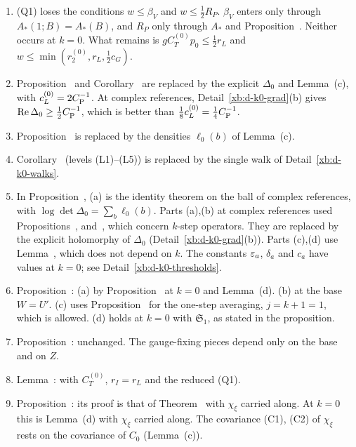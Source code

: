 \begin{detail}[Proposition~\Nref{prop:first-step}: the adaptations at $k=0$]
\begin{enumerate}[label=(\arabic*)]
\item (Q1) loses the conditions $w\le\beta_V$ and $w\le\frac12R_P$. $\beta_V$ enters only through $A_*(1;B)=A_*(B)$, and $R_P$ only through $A_*$ and Proposition~. Neither occurs at $k=0$. What remains is $gC_T^{(0)}p_0\le\frac12r_L$ and $w\le\min(r^{(0)}_2,r_L,\frac12c_G)$.
\item Proposition~ and Corollary~ are replaced by the explicit $\Delta_0$ and Lemma~(c), with $c^{(0)}_L=2C_{\rm P}^{-1}$. At complex references, Detail~\ref{xb:d-k0-grad}(b) gives $\operatorname{Re}\Delta_0\ge\frac12C_{\rm P}^{-1}$, which is better than $\frac18c^{(0)}_L=\frac14C_{\rm P}^{-1}$.
\item Proposition~ is replaced by the densities $\ell_0(b)$ of Lemma~(c).
\item Corollary~ (levels (L1)--(L5)) is replaced by the single walk of Detail~\ref{xb:d-k0-walks}.
\item In Proposition~, (a) is the identity theorem on the ball of complex references, with $\log\det\Delta_0=\sum_b\ell_0(b)$. Parts (a),(b) at complex references used Propositions~,  and~, which concern $k$-step operators. They are replaced by the explicit holomorphy of $\Delta_0$ (Detail~\ref{xb:d-k0-grad}(b)). Parts (c),(d) use Lemma~, which does not depend on $k$. The constants $\varepsilon_a$, $\delta_a$ and $c_a$ have values at $k=0$; see Detail~\ref{xb:d-k0-thresholds}.
\item Proposition~: (a) by Proposition~ at $k=0$ and Lemma~(d). (b) at the base $W=U'$. (c) uses Proposition~ for the one-step averaging, $j=k+1=1$, which is allowed. (d) holds at $k=0$ with $\mathfrak S_1$, as stated in the proposition.
\item Proposition~: unchanged. The gauge-fixing pieces depend only on the base and on $Z$.
\item Lemma~: with $C^{(0)}_T$, $r_I=r_L$ and the reduced (Q1).
\item Proposition~: its proof is that of Theorem~ with $\chi_\xi$ carried along. At $k=0$ this is Lemma~(d) with $\chi_\xi$ carried along. The covariance (C1), (C2) of $\chi_\xi$ rests on the covariance of $C_0$ (Lemma~(c)).

\end{enumerate}
\end{detail}
